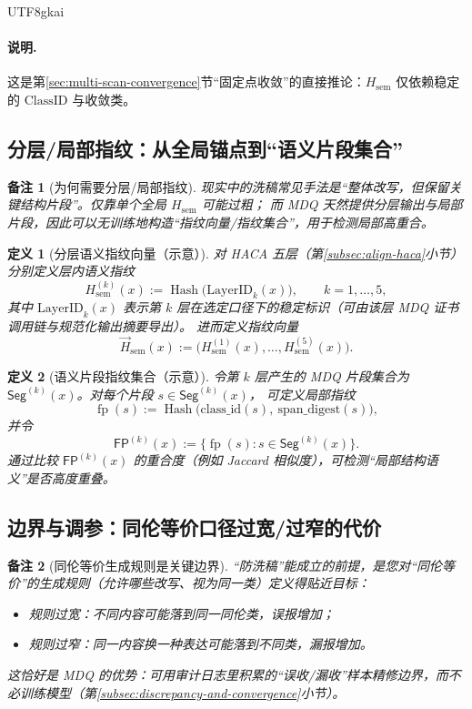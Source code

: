\documentclass[12pt]{article}
\newtheorem{definition}{定义}[section]
\newtheorem{remark}{备注}[section]
\begin{document}
\begin{CJK*}{UTF8}{gkai}
\paragraph{说明.}
这是第\ref{sec:multi-scan-convergence}节“固定点收敛”的直接推论：$H_{\mathrm{sem}}$ 仅依赖稳定的 $\mathrm{ClassID}$ 与收敛类。

\subsection{分层/局部指纹：从全局锚点到“语义片段集合”}
\label{subsec:layer-local-fingerprint}

\begin{remark}[为何需要分层/局部指纹]
现实中的洗稿常见手法是“整体改写，但保留关键结构片段”。仅靠单个全局 $H_{\mathrm{sem}}$ 可能过粗；
而 MDQ 天然提供分层输出与局部片段，因此可以无训练地构造“指纹向量/指纹集合”，用于检测局部高重合。
\end{remark}

\begin{definition}[分层语义指纹向量（示意）]
对 HACA 五层（第\ref{subsec:align-haca}小节）分别定义层内语义指纹
\[
H^{(k)}_{\mathrm{sem}}(x):=\operatorname{Hash}\bigl(\mathrm{LayerID}_k(x)\bigr),
\qquad k=1,\dots,5,
\]
其中 $\mathrm{LayerID}_k(x)$ 表示第 $k$ 层在选定口径下的稳定标识（可由该层 MDQ 证书调用链与规范化输出摘要导出）。
进而定义指纹向量
\[
\vec{H}_{\mathrm{sem}}(x):=\bigl(H^{(1)}_{\mathrm{sem}}(x),\dots,H^{(5)}_{\mathrm{sem}}(x)\bigr).
\]
\end{definition}

\begin{definition}[语义片段指纹集合（示意）]
令第 $k$ 层产生的 MDQ 片段集合为 $\mathsf{Seg}^{(k)}(x)$。对每个片段 $s\in \mathsf{Seg}^{(k)}(x)$，
可定义局部指纹
\[
\operatorname{fp}(s):=\operatorname{Hash}\bigl(\mathrm{class\_id}(s),\ \mathrm{span\_digest}(s)\bigr),
\]
并令
\[
\mathsf{FP}^{(k)}(x):=\{\operatorname{fp}(s):s\in \mathsf{Seg}^{(k)}(x)\}.
\]
通过比较 $\mathsf{FP}^{(k)}(x)$ 的重合度（例如 Jaccard 相似度），可检测“局部结构语义”是否高度重叠。
\end{definition}

\subsection{边界与调参：同伦等价口径过宽/过窄的代价}
\label{subsec:fingerprint-boundary}

\begin{remark}[同伦等价生成规则是关键边界]
“防洗稿”能成立的前提，是您对“同伦等价”的生成规则（允许哪些改写、视为同一类）定义得贴近目标：
\begin{itemize}
  \item 规则过宽：不同内容可能落到同一同伦类，误报增加；
  \item 规则过窄：同一内容换一种表达可能落到不同类，漏报增加。
\end{itemize}
这恰好是 MDQ 的优势：可用审计日志里积累的“误收/漏收”样本精修边界，而不必训练模型（第\ref{subsec:discrepancy-and-convergence}小节）。
\end{remark}


\end{CJK*}
\end{document}
